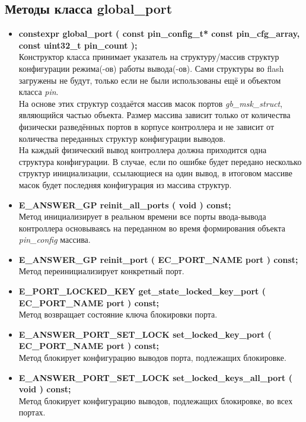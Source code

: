 \subsection{Методы класса global\_port}
\begin{itemize}
	\item \textbf{constexpr	global\_port	( const pin\_config\_t* const pin\_cfg\_array, const uint32\_t pin\_count );
	}\\Конструктор класса принимает указатель на структуру/массив структур конфигурации режима(-ов) работы  вывода(-ов). Сами структуры во flash загружены не будут, только если не были использованы ещё и объектом класса \textit{pin}.\\На основе этих структур создаётся массив масок портов \textit{gb\_msk\_struct}, являющийся частью объекта. Размер массива зависит только от количества физически разведённых портов в корпусе контроллера и не зависит от количества переданных структур конфигурации выводов.\\На каждый физический вывод контроллера должна приходится одна структура конфигурации. В случае, если по ошибке будет передано несколько структур инициализации, ссылающиеся на один вывод, в итоговом массиве масок будет последняя конфигурация из массива структур.
	\item \textbf{E\_ANSWER\_GP	reinit\_all\_ports	( void ) const;}\\Метод инициализирует в реальном времени все порты ввода-вывода контроллера основываясь на переданном во время формирования объекта \textit{pin\_config} массива.
	\item \textbf{E\_ANSWER\_GP	reinit\_port	( EC\_PORT\_NAME port ) const;}\\Метод переинициализирует конкретный порт.
	\item \textbf{E\_PORT\_LOCKED\_KEY	get\_state\_locked\_key\_port	( EC\_PORT\_NAME port ) const;}\\Метод возвращает состояние ключа блокировки порта.
	\item \textbf{E\_ANSWER\_PORT\_SET\_LOCK	set\_locked\_key\_port	( EC\_PORT\_NAME port ) const;}\\Метод блокирует конфигурацию выводов порта, подлежащих блокировке.
	\item \textbf{E\_ANSWER\_PORT\_SET\_LOCK	set\_locked\_keys\_all\_port	( void ) const; }\\Метод блокирует конфигурацию выводов, подлежащих блокировке, во всех портах.
\end{itemize}

